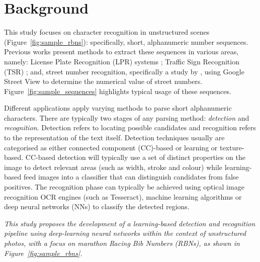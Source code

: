 \section{Background}
\label{sec:introduction:background}

This study focuses on character recognition in unstructured scenes (Figure~\ref{fig:sample_rbns}): specifically, short, alphanumeric number sequences. Previous works present methods to extract these sequences in various areas, namely: License Plate Recognition (LPR) systems \citep{CanoPerez:2003fq,Anagnostopoulos:2006wv}; Traffic Sign Recognition (TSR) \citep{Eichner:2008dw,Kundu:2015vq,Seo:2015ez,Lian:2016dc}; and, street number recognition, specifically a study by \citet{Netzer:2011to}, using Google Street View to determine the numerical value of street numbers. Figure~\ref{fig:sample_sequences} highlights typical usage of these sequences.

Different applications apply varying methods to parse short alphanumeric characters. There are typically two stages of any parsing method: \textit{detection} and \textit{recognition}. Detection refers to locating possible candidates and recognition refers to the representation of the text itself. Detection techniques usually are categorised as either connected component (CC)-based or learning or texture-based. CC-based detection will typically use a set of distinct properties on the image to detect relevant areas (such as width, stroke and colour) while learning-based feed images into a classifier that can distinguish candidates from false positives. The recognition phase can typically be achieved using optical image recognition OCR engines (such as Tesseract), machine learning algorithms or deep neural networks (NNs) to classify the detected regions. %

{
  \itshape
  This study proposes the development of a learning-based detection and recognition pipeline using deep-learning neural networks within the context of unstructured photos, with a focus on marathon Racing Bib Numbers (RBNs), as shown in Figure~\ref{fig:sample_rbns}.
}

